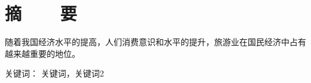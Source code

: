 %
%


%
%
\renewcommand{\baselinestretch}{1.5}
\fontsize{12pt}{13pt}\selectfont

\chapter{摘~~~~要}
\vspace{2em}

随着我国经济水平的提高，人们消费意识和水平的提升，旅游业在国民经济中占有越来越重要的地位。

\vspace{1em}
{\hei 关键词：} \quad 关键词，关键词2


